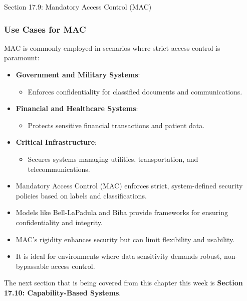 \begin{notes}{Section 17.9: Mandatory Access Control (MAC)}
    \subsubsection*{Use Cases for MAC}
    
    MAC is commonly employed in scenarios where strict access control is paramount:
    \begin{itemize}
        \item \textbf{Government and Military Systems}:
        \begin{itemize}
            \item Enforces confidentiality for classified documents and communications.
        \end{itemize}
        \item \textbf{Financial and Healthcare Systems}:
        \begin{itemize}
            \item Protects sensitive financial transactions and patient data.
        \end{itemize}
        \item \textbf{Critical Infrastructure}:
        \begin{itemize}
            \item Secures systems managing utilities, transportation, and telecommunications.
        \end{itemize}
    \end{itemize}
    
    \begin{highlight}
        \begin{itemize}
            \item Mandatory Access Control (MAC) enforces strict, system-defined security policies based on labels and classifications.
            \item Models like Bell-LaPadula and Biba provide frameworks for ensuring confidentiality and integrity.
            \item MAC's rigidity enhances security but can limit flexibility and usability.
            \item It is ideal for environments where data sensitivity demands robust, non-bypassable access control.
        \end{itemize}
    \end{highlight}
\end{notes}

The next section that is being covered from this chapter this week is \textbf{Section 17.10: Capability-Based Systems}.

